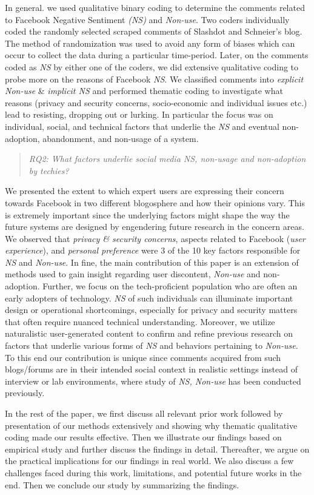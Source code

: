  In general. we used qualitative binary coding to determine the comments related to Facebook Negative Sentiment \emph{(NS)} and \emph{Non-use}. Two coders individually coded the randomly selected scraped comments of Slashdot and Schneier's blog. The method of randomization was used to avoid any form of biases which can occur to collect the data during a particular time-period. Later, on the comments coded as \emph{NS} by either one of the coders, we did extensive qualitative coding  to probe more on the reasons of Facebook \emph{NS}. We classified comments into \emph{explicit Non-use} \& \emph{implicit NS} and performed thematic coding to investigate what reasons (privacy and security concerns, socio-economic and individual issues etc.) lead to resisting, dropping out or lurking. In particular the focus was on individual, social, and technical factors that underlie the \emph{NS} and eventual non-adoption, abandonment, and non-usage of a system. 
 
 \begin{quote}
    \textit{RQ2: What factors underlie social media \textit{NS}, non-usage and non-adoption by techies?}

\end{quote}

We presented the extent to which expert users are expressing their concern towards Facebook in two different blogosphere and how their opinions vary. This is extremely important since the underlying factors might shape the way the future systems are designed by engendering future research in the concern areas. We observed that \textit{privacy \& security concerns}, aspects related to Facebook (\textit{user experience}), and \textit{personal preference} were 3 of the 10 key factors responsible for \emph{NS} and \emph{Non-use}. In fine, the main contribution of this paper is an extension of methods used to gain insight regarding user discontent, \textit{Non-use} and non-adoption. Further, we focus on the tech-proficient population who are often an early adopters of technology. \emph{NS} of such individuals can illuminate important design or operational shortcomings, especially for privacy and security matters that often require nuanced technical understanding. Moreover, we utilize naturalistic user-generated content to confirm and refine previous research on factors that underlie various forms of \emph{NS} and behaviors pertaining to \emph{Non-use}. To this end our contribution is unique since comments acquired from such blogs/forums are in their intended social context in realistic settings instead of interview or lab environments, where study of \emph{NS, Non-use} has been conducted previously.


In the rest of the paper, we first discuss all relevant prior work followed by presentation of our methods extensively and showing why thematic qualitative coding made our results effective. Then we illustrate our findings based on empirical study and further discuss the findings in detail. Thereafter, we argue on the practical implications for our findings in real world. We also discuss a few challenges faced during this work, limitations, and potential future works in the end. Then we conclude our study by summarizing the findings. 